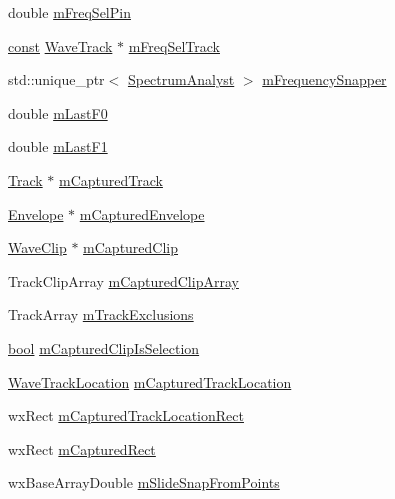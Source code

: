 \begin{DoxyCompactItemize}
\item 
double \hyperlink{class_track_panel_a4c34df1995d225287fa9140e4cb42ef4}{m\+Freq\+Sel\+Pin}
\item 
\hyperlink{getopt1_8c_a2c212835823e3c54a8ab6d95c652660e}{const} \hyperlink{class_wave_track}{Wave\+Track} $\ast$ \hyperlink{class_track_panel_ad7968d9248b67245cfb4182255d1de48}{m\+Freq\+Sel\+Track}
\item 
std\+::unique\+\_\+ptr$<$ \hyperlink{class_spectrum_analyst}{Spectrum\+Analyst} $>$ \hyperlink{class_track_panel_ac8edbb1e21b215c81157c4ba59e6c6d2}{m\+Frequency\+Snapper}
\item 
double \hyperlink{class_track_panel_aeb356a00eec72d012430064d6bc7d1b4}{m\+Last\+F0}
\item 
double \hyperlink{class_track_panel_a40bb7daf14dcfad80db2488157da31f0}{m\+Last\+F1}
\item 
\hyperlink{class_track}{Track} $\ast$ \hyperlink{class_track_panel_a5126cd1abc9c5418e7e2434a24be7643}{m\+Captured\+Track}
\item 
\hyperlink{class_envelope}{Envelope} $\ast$ \hyperlink{class_track_panel_aee4ad2084155a0cda2ec1e96cf63b30f}{m\+Captured\+Envelope}
\item 
\hyperlink{class_wave_clip}{Wave\+Clip} $\ast$ \hyperlink{class_track_panel_a0c786efdea5ce22b4cba0cd0d5616e19}{m\+Captured\+Clip}
\item 
Track\+Clip\+Array \hyperlink{class_track_panel_ad37e89caa368c3907a8d4dab00e4e34a}{m\+Captured\+Clip\+Array}
\item 
Track\+Array \hyperlink{class_track_panel_a04816694a363342378cae5293114b5d2}{m\+Track\+Exclusions}
\item 
\hyperlink{mac_2config_2i386_2lib-src_2libsoxr_2soxr-config_8h_abb452686968e48b67397da5f97445f5b}{bool} \hyperlink{class_track_panel_a14d1fdd24fac6a8e5bc3e741d3fb72ce}{m\+Captured\+Clip\+Is\+Selection}
\item 
\hyperlink{struct_wave_track_location}{Wave\+Track\+Location} \hyperlink{class_track_panel_ac829475457bde484f7f6bcdc93ec86e8}{m\+Captured\+Track\+Location}
\item 
wx\+Rect \hyperlink{class_track_panel_a44a5105dcf9ca8fa6f1a585b61bb8b58}{m\+Captured\+Track\+Location\+Rect}
\item 
wx\+Rect \hyperlink{class_track_panel_aaa67ff22cd46accfc6a7ae9c13726a8b}{m\+Captured\+Rect}
\item 
wx\+Base\+Array\+Double \hyperlink{class_track_panel_a305e2edccc89bf410007a37d88e22e9a}{m\+Slide\+Snap\+From\+Points}

\end{DoxyCompactItemize}
